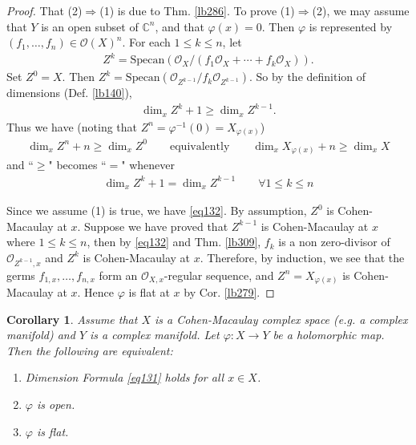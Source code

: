 \documentclass[12pt,b5paper,notitlepage]{report}
\theoremstyle{definition}
\theoremstyle{plain}
\newtheorem{co}[df]{Corollary}
\newcommand{\scr}{\mathscr}
\newcommand{\Cbb}{\mathbb C}
\newcommand{\Specan}{\mathrm{Specan}}
\numberwithin{equation}{section}
\begin{document}
\begin{proof}
That (2)$\Rightarrow$(1) is due to Thm. \ref{lb286}. To prove (1)$\Rightarrow$(2), we may assume that $Y$ is an open subset of $\Cbb^n$, and that $\varphi(x)=0$. Then $\varphi$ is represented by $(f_1,\dots,f_n)\in\scr O(X)^n$. For each $1\leq k\leq n$, let
\begin{align*}
Z^k=\Specan(\scr O_X/(f_1\scr O_X+\cdots+f_k\scr O_X)).
\end{align*}
Set $Z^0=X$. Then $Z^k=\Specan(\scr O_{Z^{k-1}}/f_k\scr O_{Z^{k-1}})$. So by the definition of dimensions (Def. \ref{lb140}), 
\begin{align*}
\dim_x Z^k+1\geq\dim_x Z^{k-1}. 
\end{align*}
Thus we have (noting that $Z^n=\varphi^{-1}(0)=X_{\varphi(x)}$)
\begin{align*}
\dim_x Z^n+n\geq \dim_x Z^0 \qquad \text{equivalently}\qquad \dim_x X_{\varphi(x)}+n\geq\dim_x X
\end{align*}
and ``$\geq$" becomes ``$=$" whenever
\begin{align}
\dim_x Z^k+1=\dim_x Z^{k-1}\qquad \forall 1\leq k\leq n \label{eq132}
\end{align}

Since we assume (1) is true, we have \eqref{eq132}. By assumption, $Z^0$ is Cohen-Macaulay at $x$. Suppose we have proved that $Z^{k-1}$ is Cohen-Macaulay at $x$ where $1\leq k\leq n$, then by \eqref{eq132} and Thm. \ref{lb309}, $f_k$ is a non zero-divisor of $\scr O_{Z^{k-1},x}$ and $Z^k$ is Cohen-Macaulay at $x$. Therefore, by induction, we see that the germs $f_{1,x},\dots,f_{n,x}$ form an $\scr O_{X,x}$-regular sequence, and $Z^n=X_{\varphi(x)}$ is Cohen-Macaulay at $x$. Hence $\varphi$ is flat at $x$ by Cor. \ref{lb279}.
\end{proof}


\begin{co}\label{lb360}
Assume that $X$ is a Cohen-Macaulay complex space (e.g. a complex manifold) and $Y$ is a complex manifold. Let $\varphi:X\rightarrow Y$ be a holomorphic map. Then the following are equivalent:
\begin{enumerate}[label=(\arabic*)]
\item Dimension Formula \eqref{eq131} holds for all $x\in X$.
\item $\varphi$ is open.
\item $\varphi$ is flat.
\end{enumerate}
\end{co}
\end{document}
